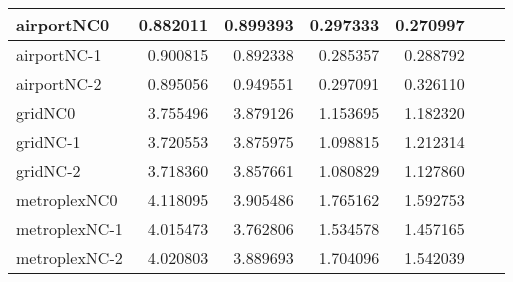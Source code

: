 \begin{longtable}{|l|r|r|r|r|r|r|}
airportNC0 & 0.882011 & 0.899393 & 0.297333 & 0.270997 \\ \hline
airportNC-1 & 0.900815 & 0.892338 & 0.285357 & 0.288792 \\ \hline
airportNC-2 & 0.895056 & 0.949551 & 0.297091 & 0.326110 \\ \hline
gridNC0 & 3.755496 & 3.879126 & 1.153695 & 1.182320 \\ \hline
gridNC-1 & 3.720553 & 3.875975 & 1.098815 & 1.212314 \\ \hline
gridNC-2 & 3.718360 & 3.857661 & 1.080829 & 1.127860 \\ \hline
metroplexNC0 & 4.118095 & 3.905486 & 1.765162 & 1.592753 \\ \hline
metroplexNC-1 & 4.015473 & 3.762806 & 1.534578 & 1.457165 \\ \hline
metroplexNC-2 & 4.020803 & 3.889693 & 1.704096 & 1.542039 \\ \hline
\end{longtable}
